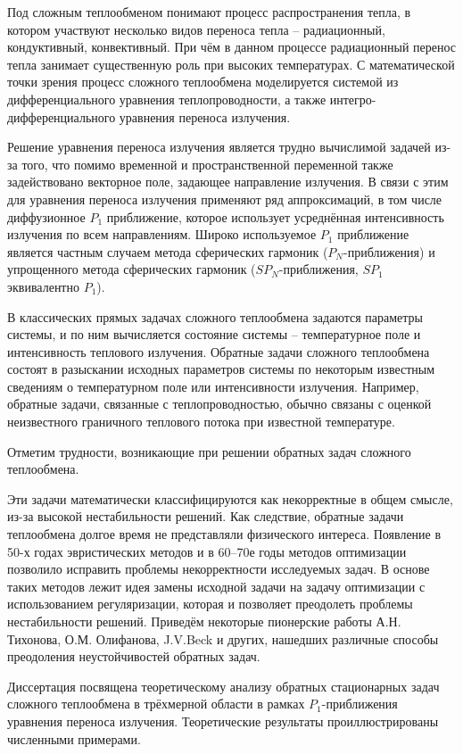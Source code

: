 Под сложным теплообменом понимают процесс распространения тепла,
в котором участвуют несколько видов переноса тепла – радиационный, кондуктивный, конвективный.
При чём в данном процессе радиационный перенос тепла занимает существенную роль при высоких температурах.
С математической точки зрения процесс сложного теплообмена моделируется системой из
дифференциального уравнения теплопроводности, а также интегро-дифференциального уравнения переноса излучения.


Решение уравнения переноса излучения является трудно вычислимой задачей из-за того,
что помимо временной и пространственной переменной также задействовано
векторное поле, задающее направление излучения.
В связи с этим для уравнения переноса излучения применяют ряд аппроксимаций,
в том числе диффузионное $P_1$ приближение, которое использует
усреднённая интенсивность излучения по всем направлениям.
Широко используемое $P_1$ приближение является частным случаем метода сферических
гармоник ($P_N$-приближения) и упрощенного метода сферических гармоник
($SP_N$-приближения, $SP_1$ эквивалентно $P_1$).


В классических прямых задачах сложного теплообмена задаются параметры системы, и по ним вычисляется
состояние системы – температурное поле и интенсивность теплового излучения.
Обратные задачи сложного теплообмена состоят в разыскании исходных параметров системы по некоторым
известным сведениям о температурном поле или интенсивности излучения.
Например, обратные задачи, связанные с теплопроводностью, обычно связаны с
оценкой неизвестного граничного теплового потока при известной температуре.


Отметим трудности, возникающие при решении обратных задач сложного теплообмена.


Эти задачи математически классифицируются как некорректные в общем смысле, из-за высокой нестабильности решений.
Как следствие, обратные задачи теплообмена долгое время не представляли физического интереса.
Появление в 50-х годах эвристических методов и в 60–70е годы методов оптимизации
позволило исправить проблемы некорректности исследуемых задач.
В основе таких методов лежит идея замены исходной задачи на задачу оптимизации
с использованием регуляризации, которая и позволяет преодолеть проблемы нестабильности решений.
Приведём некоторые пионерские работы А.Н. Тихонова, О.М. Олифанова, J.V.Beck и других, нашедших различные способы
преодоления неустойчивостей обратных задач.


Диссертация посвящена теоретическому анализу обратных стационарных
задач сложного теплообмена в трёхмерной области в рамках $P_1$-приближения
уравнения переноса излучения.
Теоретические результаты проиллюстрированы численными примерами.


